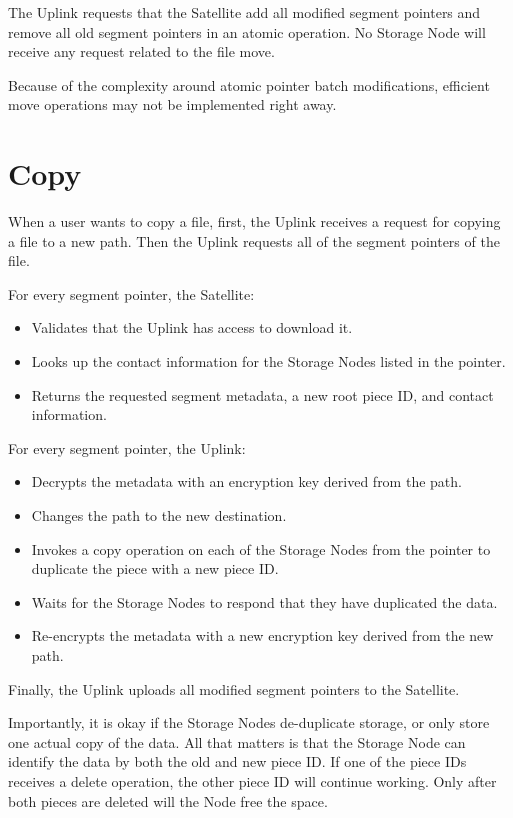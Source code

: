 \documentclass[8pt,fleqn,openany]{book}
\begin{document}
 The Uplink requests that the Satellite add
  all modified segment pointers and remove all old segment pointers in an
  atomic operation.
 No Storage Node will receive any request related to the file move.

Because of the complexity around atomic pointer batch modifications, efficient
move operations may not be implemented right away.

\section{Copy}

When a user wants to copy a file, first, the Uplink receives a request for
copying a file to a new path.
Then the Uplink requests all of the segment pointers of the file.

For every segment pointer, the Satellite:
  \begin{itemize}
  \item Validates that the Uplink has access to download it.
  \item Looks up the contact information for the Storage Nodes listed in the
    pointer.
  \item Returns the requested segment metadata, a new root piece ID, and
    contact information.
  \end{itemize}

For every segment pointer, the Uplink:
  \begin{itemize}
  \item Decrypts the metadata with an encryption key derived from the path.
  \item Changes the path to the new destination.
  \item Invokes a copy operation on each of the Storage Nodes from the pointer
    to duplicate the piece with a new piece ID.
  \item Waits for the Storage Nodes to respond that they have duplicated the
    data.
  \item Re-encrypts the metadata with a new encryption key derived from the
    new path.
  \end{itemize}

Finally, the Uplink uploads all modified segment pointers to the Satellite.

Importantly, it is okay if the Storage Nodes de-duplicate storage, or only
store one actual copy of the data. All that matters is that the Storage Node
can identify the data by both the old and new piece ID. If one of the piece
IDs receives a delete operation, the other piece ID will continue working.
Only after both pieces are deleted will the Node free the space.
\end{document}
